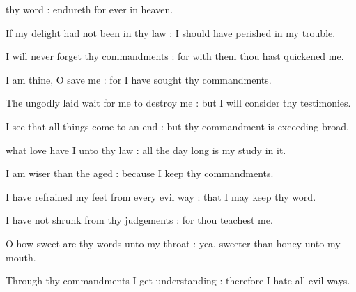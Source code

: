  thy word : endureth for ever in heaven.\par
{}
If my delight had not been in thy law : I should have perished in my trouble.\par
{}I will never forget thy commandments : for with them thou hast quickened me.\par
{}I am thine, O save me : for I have sought thy commandments.\par
{}The ungodly laid wait for me to destroy me : but I will consider thy testimonies.\par
{}I see that all things come to an end : but thy commandment is exceeding broad.\par

 what love have I unto thy law : all the day long is my study in it.\par
{}
I am wiser than the aged : because I keep thy commandments.\par
{}I have refrained my feet from every evil way : that I may keep thy word.\par
{}I have not shrunk from thy judgements : for thou teachest me.\par
{}O how sweet are thy words unto my throat : yea, sweeter than honey unto my mouth.\par
{}Through thy commandments I get understanding : therefore I hate all evil ways.\par


